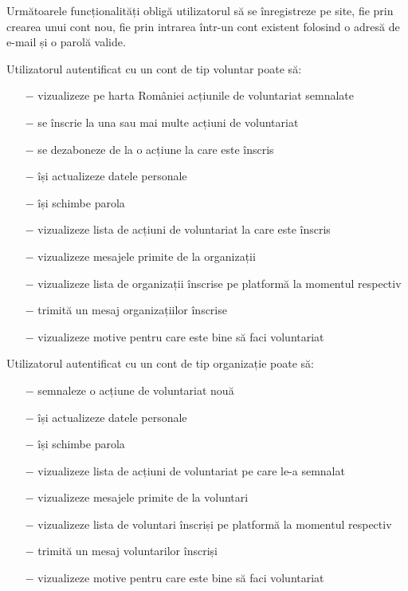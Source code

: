\documentclass[12pt,a4paper]{report}
\begin{document}
\bigskip
Următoarele funcționalități obligă utilizatorul să se înregistreze pe site, fie prin crearea unui cont nou, fie prin intrarea într-un cont existent folosind o adresă de e-mail și o parolă valide.
\\ \par
Utilizatorul autentificat cu un cont de tip voluntar poate să:
\\
\begin{itemize}
    \item[$-$] vizualizeze pe harta României acțiunile de voluntariat semnalate 
    \item[$-$] se înscrie la una sau mai multe acțiuni de voluntariat
    \item[$-$] se dezaboneze de la o acțiune la care este înscris
    \item[$-$] își actualizeze datele personale
    \item[$-$] își schimbe parola
    \item[$-$] vizualizeze lista de acțiuni de voluntariat la care este înscris
    \item[$-$] vizualizeze mesajele primite de la organizații
    \item[$-$] vizualizeze lista de organizații înscrise pe platformă la momentul respectiv
    \item[$-$] trimită un mesaj organizațiilor înscrise
    \item[$-$] vizualizeze motive pentru care este bine să faci voluntariat
\end{itemize}

\newpage
Utilizatorul autentificat cu un cont de tip organizație poate să:
\\
\begin{itemize}
    \item[$-$] semnaleze o acțiune de voluntariat nouă
    \item[$-$] își actualizeze datele personale
    \item[$-$] își schimbe parola
    \item[$-$] vizualizeze lista de acțiuni de voluntariat pe care le-a semnalat
    \item[$-$] vizualizeze mesajele primite de la voluntari
    \item[$-$] vizualizeze lista de voluntari înscriși pe platformă la momentul respectiv
    \item[$-$] trimită un mesaj voluntarilor înscriși
    \item[$-$] vizualizeze motive pentru care este bine să faci voluntariat
\end{itemize}
\end{document}
